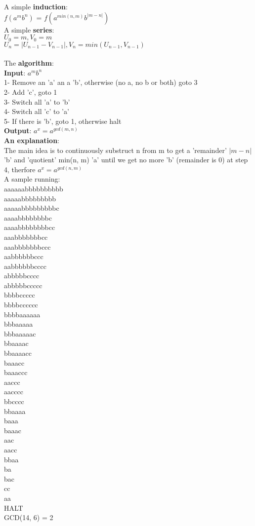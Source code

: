 \documentclass{article}
\begin{document}
\noindent A simple \textbf{induction}:\\
$f(a^mb^n)$ = $f(a^{min(n, m)}b^{|m - n|})$\\
A simple \textbf{series}:\\
$U_0  = m, V_0 = m$\\
$U_n = |U_{n-1} - V_{n-1}|, V_n = min(U_{n-1}, V_{n-1})$\\\\
The \textbf{algorithm}:\\
\textbf{Input}: $a^mb^n$\\
1- Remove an 'a' an a 'b', otherwise (no a, no b or both) goto 3\\
2- Add 'c', goto 1\\
3- Switch all 'a' to 'b'\\
4- Switch all 'c' to 'a'\\
5- If there is 'b', goto 1, otherwise halt\\
\textbf{Output}: $a^x = a^{gcd(m, n)}$\\

\textbf{An explanation}:\\
The main idea is to continuously substruct n from m to get
a 'remainder' $|m - n|$ 'b' and  'quotient'  min(n, m)  'a'
until we get no more 'b' (remainder is 0) at step 4, therfore
$a^x = a^{gcd(n, m)}$\\


 \noindent A sample running:\\
aaaaaabbbbbbbbbb\\
aaaaabbbbbbbbb\\
aaaaabbbbbbbbbc\\
aaaabbbbbbbbc\\
aaaabbbbbbbbcc\\
aaabbbbbbbcc\\
aaabbbbbbbccc\\
aabbbbbbccc\\
aabbbbbbcccc\\
abbbbbcccc\\
abbbbbccccc\\
bbbbccccc\\
bbbbcccccc\\
bbbbaaaaaa\\
bbbaaaaa\\
bbbaaaaac\\
bbaaaac\\
bbaaaacc\\
baaacc\\
baaaccc\\
aaccc\\
aacccc\\
bbcccc\\
bbaaaa\\
baaa\\
baaac\\
aac\\
aacc\\
bbaa\\
ba\\
bac\\
cc\\
aa\\
HALT\\
GCD(14, 6) = 2
\end{document}
